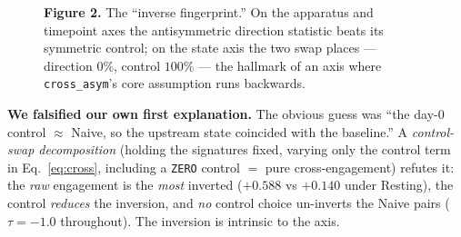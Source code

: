 \documentclass[11pt]{article}
\begin{document}
\begin{figure}[h]
\centering
{}
\caption*{\textbf{Figure 2.} The ``inverse fingerprint.'' On the apparatus and timepoint axes the
antisymmetric direction statistic beats its symmetric control; on the state axis the two swap
places --- direction $0\%$, control $100\%$ --- the hallmark of an axis where \texttt{cross\_asym}'s
core assumption runs backwards.}
\end{figure}

\textbf{We falsified our own first explanation.} The obvious guess was ``the day-0 control
$\approx$ Naive, so the upstream state coincided with the baseline.'' A \emph{control-swap
decomposition} (holding the signatures fixed, varying only the control term in
Eq.~\eqref{eq:cross}, including a \texttt{ZERO} control $=$ pure cross-engagement) refutes it:
the \emph{raw} engagement is the \emph{most} inverted ($+0.588$ vs $+0.140$ under Resting), the
control \emph{reduces} the inversion, and \emph{no} control choice un-inverts the Naive pairs
($\tau=-1.0$ throughout). The inversion is intrinsic to the axis.
\end{document}
